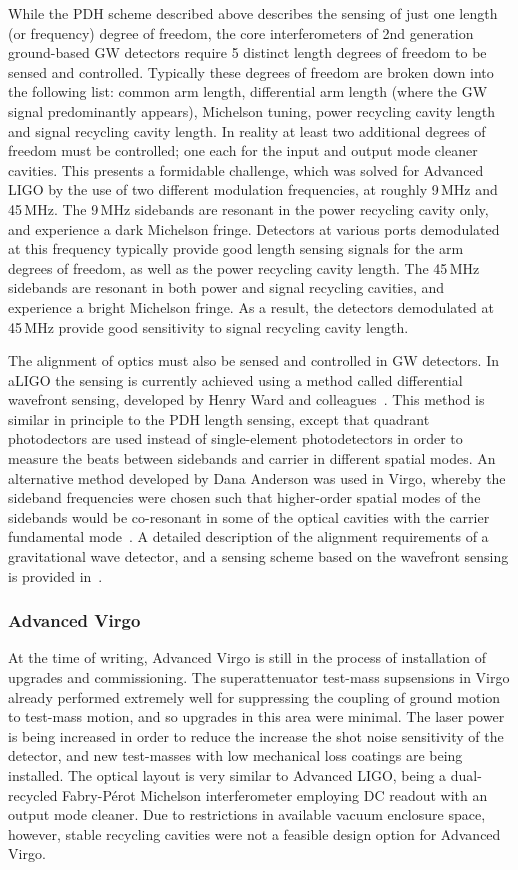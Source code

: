 While the PDH scheme described above describes the sensing of just one length (or frequency) degree of freedom, 
the core interferometers of 2nd generation ground-based GW detectors require 5 distinct length degrees of freedom to 
be sensed and controlled. Typically these degrees of freedom are broken down into the following list: common arm length, 
differential arm length (where the GW signal predominantly appears), Michelson tuning, power recycling cavity length and 
signal recycling cavity length. In reality at least two additional degrees of freedom must be controlled; one each for the input 
and output mode cleaner cavities. This presents a formidable challenge, which was solved for Advanced LIGO by the use of two 
different modulation frequencies, at roughly 9\,MHz and 45\,MHz. The 9\,MHz sidebands are resonant in the power recycling 
cavity only, and experience a dark Michelson fringe. Detectors at various ports demodulated at this frequency typically provide 
good length sensing signals for the arm degrees of freedom, as well as the power recycling cavity length. The 45\,MHz sidebands 
are resonant in both power and signal recycling cavities, and experience a bright Michelson fringe. As a result, the detectors demodulated 
at 45\,MHz provide good sensitivity to signal recycling cavity length.

The alignment of optics must also be sensed and controlled in GW detectors. In aLIGO the sensing is currently achieved using a method 
called differential wavefront sensing, developed by Henry Ward and colleagues~\cite{Morrison1994, Morrison1994b}. 
This method is similar in principle to the PDH length sensing, 
except that quadrant photodectors are used 
instead of single-element photodetectors in order to measure the beats between sidebands and carrier in different spatial modes. An 
alternative method developed by Dana Anderson was used in Virgo, whereby the sideband frequencies were chosen such that higher-order 
spatial modes of the sidebands would be co-resonant in some of the optical cavities with the carrier fundamental mode~\cite{Anderson1984}. 
A detailed description of the alignment requirements of a gravitational wave detector, and a sensing scheme based on the wavefront sensing 
is provided in~\cite{Fritschel1998}.

\subsubsection{Advanced Virgo}
At the time of writing, Advanced Virgo is still in the process of installation of upgrades and commissioning. 
The superattenuator test-mass supsensions in Virgo already performed extremely well for suppressing the coupling of ground motion 
to test-mass motion, and so upgrades in this area were minimal. The laser power is being increased in order to reduce the increase the shot 
noise sensitivity of the detector, and new test-masses with low mechanical loss coatings are being installed. The optical layout is 
very similar to Advanced LIGO, being a dual-recycled Fabry-P\'{e}rot Michelson interferometer employing DC readout with an output mode cleaner. 
Due to restrictions in available vacuum enclosure space, however, stable recycling cavities were not a feasible design option for Advanced Virgo. 


